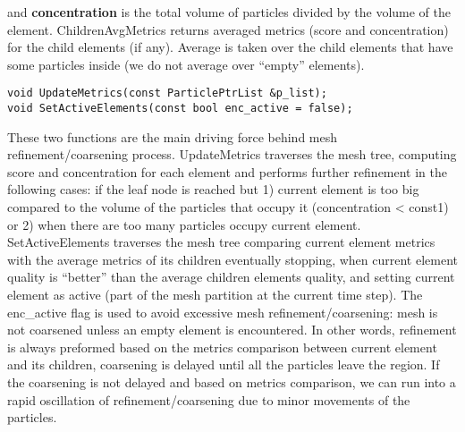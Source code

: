 and {\bf concentration} is the total volume of particles divided by the volume of the element. ChildrenAvgMetrics
returns averaged metrics (score and concentration) for the child elements (if any). Average is taken over the
child elements that have some particles inside (we do not average over ``empty'' elements).
\begin{lstlisting}
void UpdateMetrics(const ParticlePtrList &p_list);
void SetActiveElements(const bool enc_active = false);
\end{lstlisting}
These two functions are the main driving force behind mesh refinement/coarsening process. UpdateMetrics traverses the
mesh tree, computing score and concentration for each element and performs further refinement in the following cases:
if the leaf node is reached but 1) current element is too big compared to the volume of the particles that occupy it
(concentration < const1) or 2) when there are too many particles occupy current element. SetActiveElements traverses
the mesh tree comparing current element metrics with the average metrics of its children eventually stopping, when
current element quality is ``better'' than the average children elements quality, and setting current element as
active (part of the mesh partition at the current time step). The enc\_active flag is used to avoid excessive mesh
refinement/coarsening: mesh is not coarsened unless an empty element is encountered. In other words, refinement is
always preformed based on the metrics comparison between current element and its children, coarsening is delayed
until all the particles leave the region. If the coarsening is not delayed and based on metrics comparison, we
can run into a rapid oscillation of refinement/coarsening due to minor movements of the particles.
